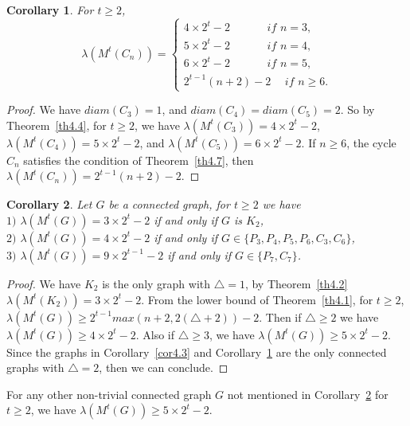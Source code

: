 \documentclass{article}
\newtheorem{cor} {Corollary}
\newtheorem{open problem} {Open Problem}
\numberwithin{lemma}{section}
\numberwithin{theorem}{section}
\numberwithin{cor}{section}
\numberwithin{prop}{section}
\numberwithin{con}{section}
\numberwithin{claim}{section}
\numberwithin{obs}{section}
\numberwithin{dnt}{section}
\begin{document}
\begin{cor}\label{cor4.4}
	For $t\geq 2$,	$$\lambda(M^t(C_n))=\begin{cases}
	4\times 2^t-2 \hspace{40pt}if\,\, n=3, \\
	5\times 2^t-2 \hspace{40pt}if\,\, n=4, \\
	6\times 2^t-2 \hspace{40pt}if\,\, n=5, \\
	2^{t-1}(n+2)-2 \hspace{15pt}if\,\,n \geq 6.	
	\end{cases}$$	
\end{cor} 
\begin{proof}
	We have $diam(C_3)=1$, and  $diam(C_4)=diam(C_5)=2$. So by Theorem~\ref{th4.4}, for $t\geq 2$, we have $\lambda(M^t(C_3))=4\times 2^t-2$, $\lambda(M^t(C_4))=5\times 2^t-2$, and $\lambda(M^t(C_5))=6\times 2^t-2$. If $n\geq 6$, the cycle $C_n$ satisfies the condition of Theorem~\ref{th4.7}, then $\lambda(M^t(C_n))=2^{t-1}(n+2)-2$.
\end{proof}
\begin{cor}\label{cor4.5}
	Let $G$ be a connected graph, for $t\geq 2$ we have \\
	$1)$	$\lambda(M^t(G))=3\times 2^t-2$   if and only if  $G$ is $K_2$,\\
	$2)$	$\lambda(M^t(G))=4\times 2^t-2$   if and only if  $G \in \{ P_3, P_4, P_5,P_6,C_3,C_6  \}$,\\
	$3)$	$\lambda(M^t(G))=9\times 2^{t-1}-2$   if and only if  $G \in \{ P_7,C_7 \}$.		
\end{cor} 
\begin{proof}
	We have $K_2$ is the only graph with $\bigtriangleup=1$, by Theorem~\ref{th4.2} $\lambda(M^t(K_2))=3\times 2^t-2$. From the lower bound of Theorem~\ref{th4.1}, for $t\geq2$, $\lambda(M^t (G)) \geq 2^{t-1}max(n+2, 2(\bigtriangleup+2))-2$.  Then if $\bigtriangleup\geq 2$ we have $\lambda(M^t (G))\geq 4\times 2^t-2$. Also if $\bigtriangleup\geq 3$, we have $\lambda(M^t (G))\geq 5\times 2^t-2$. Since the graphs in  Corollary~\ref{cor4.3} and Corollary~\ref{cor4.4} are the only connected graphs with $\bigtriangleup=2$, then we can conclude. 
\end{proof}
For any other non-trivial connected graph $G$ not mentioned in Corollary~\ref{cor4.5} for $t\geq 2$, we have $\lambda(M^t(G))\geq 5\times 2^t-2$. 
\end{document}
